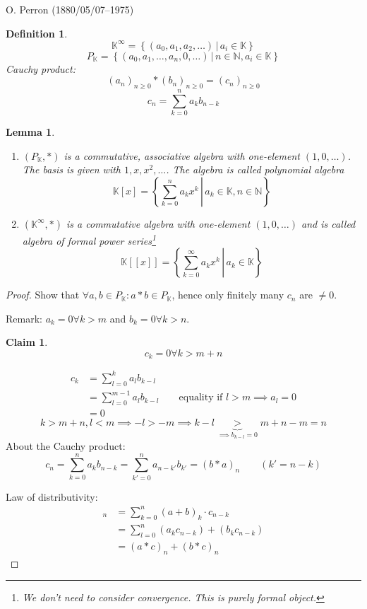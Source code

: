 \documentclass{article}
\newtheorem{definition}{Definition}  \numberwithin{definition}{section}
\newtheorem{lemma}{Lemma}  \numberwithin{lemma}{section}
\newtheorem*{claim}{Claim}%
\newcommand{\setdef}[2]{\left\{\left.#1\,\right|\,#2\right\}}
\begin{document}
O. Perron (1880/05/07--1975)

\begin{definition} %
  \[ \mathbb K^\infty = \setdef{(a_0, a_1, a_2, \dots)}{a_i \in \mathbb K} \]
  \[ P_{\mathbb K} = \setdef{(a_0, a_1, \dots, a_n, 0, \dots)}{n \in \mathbb N, a_i \in \mathbb K} \]
  Cauchy product:
  \[ (a_n)_{n \geq 0} * (b_n)_{n \geq 0} = (c_n)_{n \geq 0} \]
  \[ c_n = \sum_{k=0}^n a_k b_{n-k} \]
\end{definition}

\begin{lemma} %
  \begin{enumerate}
    \item $(P_{\mathbb K}, *)$ is a commutative, associative algebra with one-element $(1, 0, \dots)$.
      The basis is given with $1, x, x^2, \dots$. The algebra is called \emph{polynomial algebra}
      \[ \mathbb K[x] = \setdef{\sum_{k=0}^n a_k x^k}{a_k \in \mathbb K, n \in \mathbb N} \]
    \item $(\mathbb K^\infty, *)$ is a commutative algebra with one-element $(1, 0, \dots)$
      and is called \emph{algebra of formal power series}\footnote{We don't need to consider convergence. This is purely formal object.}
      \[ \mathbb K[[x]] = \setdef{\sum_{k=0}^\infty a_k x^k}{a_k \in \mathbb K} \]
  \end{enumerate}
\end{lemma}

\begin{proof}
  Show that $\forall a,b \in P_{\mathbb K}: a * b \in P_{\mathbb K}$, hence only finitely many $c_n$ are $\neq 0$.

  Remark: $a_k = 0 \forall k > m$ and $b_k = 0 \forall k > n$.

  \begin{claim}
    \[ c_k = 0 \forall k > m + n \]
  \end{claim}

  \begin{align*}
    c_k &= \sum_{l=0}^k a_l b_{k-l} \\
      &= \sum_{l=0}^{m-1} a_l b_{k-l} \qquad \text{equality if $l > m \implies a_l = 0$} \\
      &= 0
  \end{align*}
  \[ k > m + n, l < m \implies -l > -m \implies k - l \underbrace{>}_{\implies b_{k-l} = 0} m + n - m = n \]
  About the Cauchy product:
  \[ c_n = \sum_{k=0}^n a_k b_{n-k} = \sum_{k'=0}^n a_{n-k'} b_{k'} = (b * a)_n \qquad (k' = n - k) \]

  Law of distributivity:
  \begin{align*}
    [(a + b) * c]_n &= \sum_{k=0}^n (a + b)_k \cdot c_{n-k} \\
      &= \sum_{l=0}^n (a_k c_{n-k}) + (b_k c_{n-k}) \\
      &= (a * c)_n + (b * c)_n
  \end{align*}
\end{proof}
\end{document}
